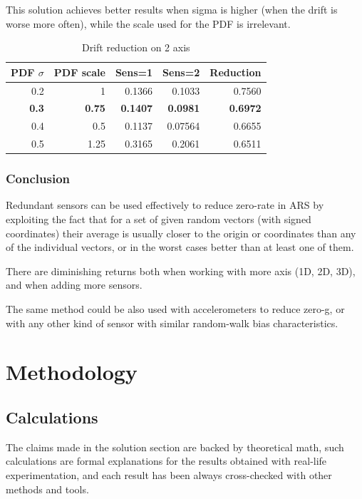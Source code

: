 \documentclass[10pt, twocolumn, a4paper]{article}
\begin{document}
            This solution achieves better results when sigma is higher (when the drift is worse more often), while the scale used for the PDF is irrelevant.
            \begin{table}[H]
                \caption{Drift reduction on 2 axis}
                \vspace{2mm}
                \begin{tabular}{|r|r|r|r|r|}
                    \hline
                        PDF $\sigma$ & PDF scale & Sens=1 & Sens=2 & Reduction \\
                    \hline
                        0.2 & 1    & 0.1366 & 0.1033  & 0.7560 \\
                        \textbf{0.3} & \textbf{0.75} & \textbf{0.1407} & \textbf{0.0981} & \textbf{0.6972} \\
                        0.4 & 0.5  & 0.1137 & 0.07564 & 0.6655 \\
                        0.5 & 1.25 & 0.3165 & 0.2061  & 0.6511 \\
                    \hline
                \end{tabular}
            \end{table}

        \subsubsection{Conclusion}
            Redundant sensors can be used effectively to reduce zero-rate in ARS by exploiting the fact that for a set of given random vectors (with signed coordinates) their average is usually closer to the origin or coordinates than any of the individual vectors, or in the worst cases better than at least one of them.

            There are diminishing returns both when working with more axis (1D, 2D, 3D), and when adding more sensors.

            The same method could be also used with accelerometers to reduce zero-g, or with any other kind of sensor with similar random-walk bias characteristics.


\section{Methodology}
    \subsection{Calculations}
    The claims made in the solution section are backed by theoretical math, such calculations are formal explanations for the results obtained with real-life experimentation, and each result has been always cross-checked with other methods and tools.
\end{document}
